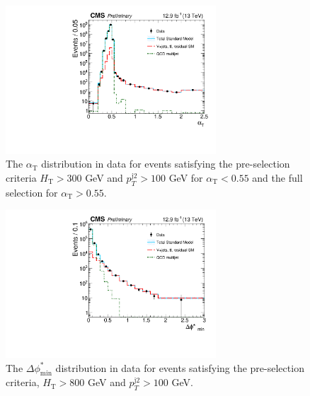 \maketitle



\clearpage
\begin{figure}[tbhp]
    \caption{ 
    The $\alpha_{\mathrm{T}}$ distribution in data for events satisfying the pre-selection criteria $H_{\mathrm{T}} > 300$ GeV and $p_{T}^{\mathrm{j2}} > 100$ GeV for $\alpha_{\mathrm{T}} < 0.55$ and the full selection for $\alpha_{\mathrm{T}} > 0.55$.
    \label{fig:alphaT} }
  \begin{center}
  \includegraphics[width=0.7\textwidth]{alphaT_aux}
  \end{center}
\end{figure}


\begin{figure}[tbhp]
    \caption{ 
    The $\Delta\phi^{*}_{\mathrm{min}}$ distribution in data for events satisfying the pre-selection criteria, $H_{\mathrm{T}} > 800$ GeV and $p_{T}^{\mathrm{j2}} > 100$ GeV. 
    \label{fig:bDPhi} }
  \begin{center}
  \includegraphics[width=0.7\textwidth]{bDPhi_aux}
  \end{center}
\end{figure}

